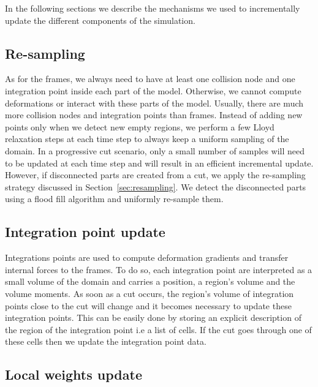In the following sections we describe the mechanisms we used to incrementally update the different components of the simulation.

\subsection{Re-sampling}
\label{sec:all_resampling}
As for the frames, we always need to have at least one collision node and one integration point inside each part of the model. Otherwise, we cannot compute deformations or interact with these parts of the model. Usually, there are much more collision nodes and integration points than frames. Instead of adding new points only when we detect new empty regions, we perform a few Lloyd relaxation steps at each time step to always keep a uniform sampling of the domain. In a progressive cut scenario, only a small number of samples will need to be updated at each time step and will result in an efficient incremental update. However, if disconnected parts are created from a cut, we apply the re-sampling strategy discussed in Section~\ref{sec:resampling}. We detect the disconnected parts using a flood fill algorithm and uniformly re-sample them.

\subsection{Integration point update}
\label{sec:gausspointupdate}

Integrations points are used to compute deformation gradients and transfer internal forces to the frames. To do so, each integration point are interpreted as a small volume of the domain and carries a position, a region's volume and the volume moments. As soon as a cut occurs, the region's volume of integration points close to the cut will change and it becomes necessary to update these integration points. This can be easily done by storing an explicit description of the region of the integration point i.e a list of cells. If the cut goes through one of these cells then we update the integration point data.

\subsection{Local weights update} \label{sec:interpolation}

